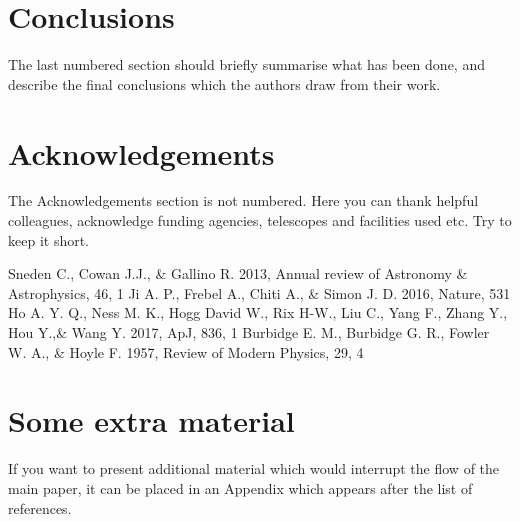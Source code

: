 \documentclass[a4paper,fleqn,usenatbib]{mnras}
\begin{document}
\section{Conclusions}

The last numbered section should briefly summarise what has been done, and describe
the final conclusions which the authors draw from their work.

\section*{Acknowledgements}

The Acknowledgements section is not numbered. Here you can thank helpful
colleagues, acknowledge funding agencies, telescopes and facilities used etc.
Try to keep it short.




\begin{thebibliography}{99}
	Sneden C., Cowan J.J., \& Gallino R. 2013, Annual review of Astronomy \& Astrophysics, 46, 1
	Ji A. P., Frebel A., Chiti A., \& Simon J. D. 2016, Nature, 531
	Ho A. Y. Q., Ness M. K., Hogg David W., Rix H-W., Liu C., Yang F., Zhang Y., Hou Y.,\& Wang Y. 2017, ApJ, 836, 1
	Burbidge E. M., Burbidge G. R., Fowler W. A., \& Hoyle F. 1957, Review of Modern Physics, 29, 4
\end{thebibliography}



\appendix

\section{Some extra material}

If you want to present additional material which would interrupt the flow of the main paper,
it can be placed in an Appendix which appears after the list of references.

\label{lastpage}
\end{document}
